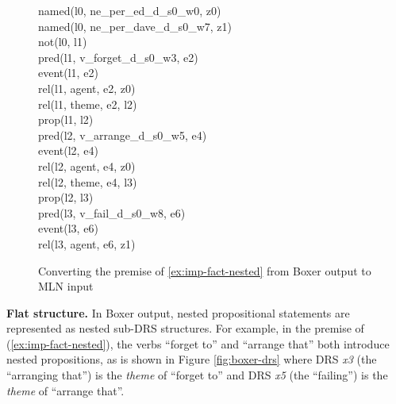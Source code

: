 \begin{small}
\begin{figure}
{{		\vspace{-.7ex}
		{\footnotesize named(l0, ne\_per\_ed\_d\_s0\_w0, z0)} \\
		\vspace{-.7ex}
		{\footnotesize named(l0, ne\_per\_dave\_d\_s0\_w7, z1)} \\
		\vspace{-.7ex}
		{\footnotesize not(l0, l1)} \\
		\vspace{-.7ex}
		{\footnotesize pred(l1, v\_forget\_d\_s0\_w3, e2)} \\
		\vspace{-.7ex}
		{\footnotesize event(l1, e2)} \\
		\vspace{-.7ex}
		{\footnotesize rel(l1, agent, e2, z0)} \\
		\vspace{-.7ex}
		{\footnotesize rel(l1, theme, e2, l2)} \\
		\vspace{-.7ex}
		{\footnotesize prop(l1, l2)} \\
		\vspace{-.7ex}
		{\footnotesize pred(l2, v\_arrange\_d\_s0\_w5, e4)} \\
		\vspace{-.7ex}
		{\footnotesize event(l2, e4)} \\
		\vspace{-.7ex}
		{\footnotesize rel(l2, agent, e4, z0)} \\
		\vspace{-.7ex}
		{\footnotesize rel(l2, theme, e4, l3)} \\
		\vspace{-.7ex}
		{\footnotesize prop(l2, l3)} \\
		\vspace{-.7ex}
		{\footnotesize pred(l3, v\_fail\_d\_s0\_w8, e6)} \\
		\vspace{-.7ex}
		{\footnotesize event(l3, e6)} \\
		\vspace{-.7ex}
		{\footnotesize rel(l3, agent, e6, z1)}
		\vspace{-2ex}
	}
  }
  \caption{Converting the premise of \eqref{ex:imp-fact-nested} from
  Boxer output to MLN input}
  \label{fig:boxer-conversion}
\end{figure}
\end{small}

\noindent\textbf{Flat structure.}
In Boxer output, nested propositional statements are represented as nested sub-DRS structures.
  For example, in the premise of
(\ref{ex:imp-fact-nested}), the verbs ``forget to'' and ``arrange that'' both
introduce nested propositions, as is shown in Figure \ref{fig:boxer-drs} where
DRS {\it x3} (the ``arranging that'') is the {\it theme} of ``forget to'' and
DRS {\it x5} (the ``failing'') is the {\it theme} of ``arrange that''.  

